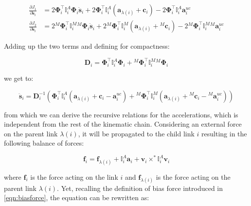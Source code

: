 \begin{align}
    \frac{\partial J _1}{\partial \ddot{\mathbf{s}} _i} & = 2 \boldsymbol{\Phi} ^\top _i \mathbb{I} ^A _i \boldsymbol{\Phi} _i \ddot{\mathbf{s}} _i + 2 \boldsymbol{\Phi} ^\top _i \mathbb{I} ^A _i (\mathbf{a} _{\lambda (i)} + \mathbf{c} _i) - 2 \boldsymbol{\Phi} ^\top _i \mathbb{I} ^A _i \mathbf{a} ^{uc} _i \nonumber                                        \\
    \frac{\partial J _2}{\partial \ddot{\mathbf{s}} _i} & = 2 {} ^M \boldsymbol{\Phi} ^\top _i \mathbb{I} ^M _i {} ^M \boldsymbol{\Phi} _i \ddot{\mathbf{s}} _i + 2 {} ^M  \boldsymbol{\Phi} ^\top _i \mathbb{I} ^M _i (\mathbf{a} _{\lambda (i)} + {} ^M  \mathbf{c} _i) - 2 {} ^M \boldsymbol{\Phi} ^\top _i \mathbb{I} ^M _i {} ^M \mathbf{a} ^{uc} _i  \nonumber
\end{align}

Adding up the two terms and defining for compactness:

\begin{equation}
    \mathbf{D} _i = \boldsymbol{\Phi} ^\top _i \mathbb{I} ^A _i \boldsymbol{\Phi} _i + {} ^M \boldsymbol{\Phi} ^\top _i \mathbb{I} ^M _i {} ^M \boldsymbol{\Phi} _i
\end{equation}

we get to:

\begin{equation}
    \label{eqn:aba_jointacc}
    \ddot{\mathbf{s}} _i = \mathbf{D} _i ^{-1} (\boldsymbol{\Phi} ^\top _i \mathbb{I} ^A _i (\mathbf{a} _{\lambda (i)} + \mathbf{c} _i - \mathbf{a} ^{uc} _i) + {} ^M \boldsymbol{\Phi} ^\top _i \mathbb{I} ^M _i ( \mathbf{a} _{\lambda (i)} + {} ^M \mathbf{c} _i - {} ^M \mathbf{a} ^{uc} _i))
\end{equation}

from which we can derive the recursive relations for the accelerations, which is independent from the rest of the kinematic chain. Considering an external force on the parent link $\lambda (i)$, it will be propagated to the child link $i$ resulting in the following balance of forces:

\begin{equation}
    \mathbf{f} _i = \mathbf{f} _{\lambda (i)} + \mathbb{I} ^A _i \mathbf{a} _i + \mathbf{v} _i \times ^* \mathbb{I} ^A _i \mathbf{v} _i
\end{equation}

where $\mathbf{f} _i$ is the force acting on the link $i$ and $\mathbf{f} _{\lambda (i)}$ is the force acting on the parent link $\lambda (i)$. Yet, recalling the definition of bias force introduced in \cref{eqn:biasforce}, the equation can be rewritten as:

